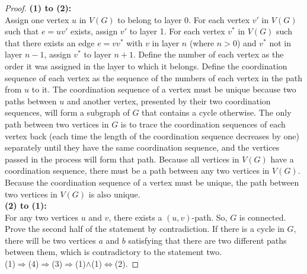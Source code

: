 \documentclass[a4paper,12pt]{report}
\begin{document}
\begin{proof}
\textbf{(1) to (2):} \\
Assign one vertex \(u\) in \(V(G)\) to belong to layer 0. For each vertex \(v'\) in \(V(G)\) such that \(e = uv'\) exists, assign \(v'\) to layer 1. For each vertex \(v^*\) in \(V(G)\) such that there exists an edge \(e = vv^*\) with \(v\) in layer \(n\) (where \(n > 0\)) and \(v^*\) not in layer \(n-1\), assign \(v^*\) to layer \(n+1\). Define the number of each vertex as the order it was assigned in the layer to which it belongs. Define the coordination sequence of each vertex as the sequence of the numbers of each vertex in the path from \(u\) to it. The coordination sequence of a vertex must be unique because two paths between \(u\) and another vertex, presented by their two coordination sequences, will form a subgraph of $G$ that contains a cycle otherwise. The only path between two vertices in $G$ is to trace the coordination sequences of each vertex back (each time the length of the coordination sequence decreases by one) separately until they have the same coordination sequence, and the vertices passed in the process will form that path. Because all vertices in $V(G)$ have a coordination sequence, there must be a path between any two vertices in $V(G)$. Because the coordination sequence of a vertex must be unique, the path between two vertices in $V(G)$ is also unique. \\
\textbf{(2) to (1):} \\
For any two vertices \(u\) and \(v\), there exists a \((u, v)\)-path. So, \(G\) is connected. Prove the second half of the statement by contradiction. If there is a cycle in \(G\), there will be two vertices \(a\) and \(b\) satisfying that there are two different paths between them, which is contradictory to the statement two. \\
(1)$\Rightarrow$(4)$\Rightarrow$(3)$\Rightarrow$(1)$\wedge$(1)$\Leftrightarrow$(2).
\end{proof}
\end{document}
